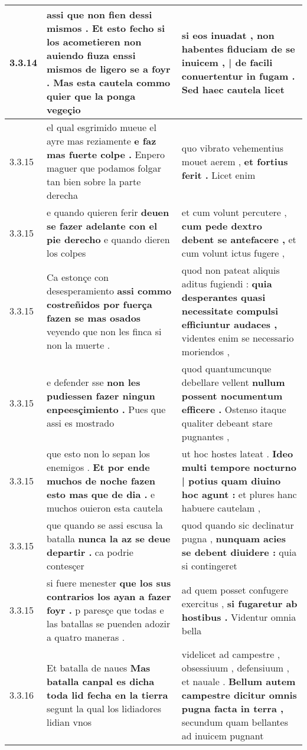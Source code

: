 \begin{tabular}{|p{1cm}|p{6.5cm}|p{6.5cm}|}
3.3.14 & assi que non fien dessi mismos . \textbf{ Et esto fecho si los acometieren non auiendo fiuza enssi mismos de ligero se a foyr . } Mas esta cautela commo quier que la ponga vegeçio & si eos inuadat , \textbf{ non habentes fiduciam de se inuicem , | de facili conuertentur in fugam . } Sed haec cautela licet \\\hline
3.3.15 & el qual esgrimido mueue el ayre mas reziamente \textbf{ e faz mas fuerte colpe . } Enpero maguer que podamos folgar tan bien sobre la parte derecha & quo vibrato vehementius mouet aerem , \textbf{ et fortius ferit . } Licet enim \\\hline
3.3.15 & e quando quieren ferir \textbf{ deuen se fazer adelante con el pie derecho } e quando dieren los colpes & et cum volunt percutere , \textbf{ cum pede dextro debent se antefacere , } et cum volunt ictus fugere , \\\hline
3.3.15 & Ca estonçe con desesperamiento \textbf{ assi commo costreñidos por fuerça fazen se mas osados } veyendo que non les finca si non la muerte . & quod non pateat aliquis aditus fugiendi : \textbf{ quia desperantes quasi necessitate compulsi efficiuntur audaces , } videntes enim se necessario moriendos , \\\hline
3.3.15 & e defender sse \textbf{ non les pudiessen fazer ningun enpeesçimiento . } Pues que assi es mostrado & quod quantumcunque debellare vellent \textbf{ nullum possent nocumentum efficere . } Ostenso itaque qualiter debeant stare pugnantes , \\\hline
3.3.15 & que esto non lo sepan los enemigos . \textbf{ Et por ende muchos de noche fazen esto mas que de dia . } e muchos ouieron esta cautela & ut hoc hostes lateat . \textbf{ Ideo multi tempore nocturno | potius quam diuino hoc agunt : } et plures hanc habuere cautelam , \\\hline
3.3.15 & que quando se assi escusa la batalla \textbf{ nunca la az se deue departir . } ca podrie contesçer & quod quando sic declinatur pugna , \textbf{ nunquam acies se debent diuidere : } quia si contingeret \\\hline
3.3.15 & si fuere menester \textbf{ que los sus contrarios los ayan a fazer foyr . } p paresçe que todas e las batallas se puenden adozir a quatro maneras . & ad quem posset confugere exercitus , \textbf{ si fugaretur ab hostibus . } Videntur omnia bella \\\hline
3.3.16 & Et batalla de naues \textbf{ Mas batalla canpal es dicha toda lid fecha en la tierra } segunt la qual los lidiadores lidian vnos & videlicet ad campestre , obsessiuum , defensiuum , et nauale . \textbf{ Bellum autem campestre dicitur omnis pugna facta in terra , } secundum quam bellantes ad inuicem pugnant \\\hline

\end{tabular}
